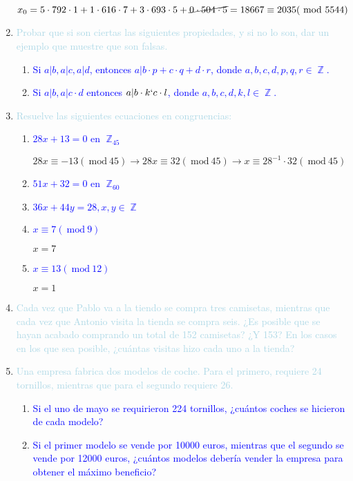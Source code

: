 \documentclass[12pt]{article}
\newcommand{\lb}[1]{\textcolor{lightblue}{#1}}
\newcommand{\db}[1]{\textcolor{blue}{#1}}
\DeclareMathOperator{\Z}{\mathbb{Z}}
\renewcommand{\mod}{~\mathrm{mod}~}
\begin{document}
\begin{enumerate}[label=\color{red}\textbf{\arabic*)}, leftmargin=*]
    $x_0=5\cdot792\cdot1+1\cdot616\cdot7+3\cdot693\cdot5+\cancel{0\cdot504\cdot5}=18667\equiv2035(\mod5544)$
   	\item \lb{Probar que si son ciertas las siguientes propiedades, y si no lo son, dar un ejemplo que muestre que son falsas.}
	\begin{enumerate}[label=\color{red}\alph*)]
		\item \db{Si $a|b,a|c,a|d$, entonces $a|b\cdot p+c\cdot q+d\cdot r$, donde $a,b,c,d,p,q,r\in\Z$.}
		\item \db{Si $a|b,a|c\cdot d$ entonces $a|b\cdot k`c\cdot l$, donde $a,b,c,d,k,l\in\Z$.}
	\end{enumerate}
	\item \lb{Resuelve las siguientes ecuaciones en congruencias:}
	\begin{enumerate}[label=\color{red}\alph*)]
		\item \db{$28x+13=0$ en $\Z_{45}$}
		
		$28x\equiv-13(\mod45)\longrightarrow28x\equiv32(\mod45)\longrightarrow x\equiv28^{-1}\cdot32(\mod45)$
		\item \db{$51x+32=0$ en $\Z_{60}$}
		\item \db{$36x+44y=28, x,y\in \Z$}
		\item \db{$x\equiv7(\mod9)$}
		
		$x=7$
		\item \db{$x\equiv13(\mod12)$}
		
		$x=1$
	\end{enumerate}
	\item \lb{Cada vez que Pablo va a la tiendo se compra tres camisetas, mientras que cada vez que Antonio visita la tienda se compra seis. ¿Es posible que se hayan acabado comprando un total de 152 camisetas? ¿Y 153? En los casos en los que sea posible, ¿cuántas visitas hizo cada uno a la tienda?}
	\item \lb{Una empresa fabrica dos modelos de coche. Para el primero, requiere 24 tornillos, mientras que para el segundo requiere 26.}
	\begin{enumerate}[label=\color{red}\alph*)]
		\item \db{Si el uno de mayo se requirieron 224 tornillos, ¿cuántos coches se hicieron de cada modelo?}
		\item \db{Si el primer modelo se vende por 10000 euros, mientras que el segundo se vende por 12000 euros, ¿cuántos modelos debería vender la empresa para obtener el máximo beneficio?}
	\end{enumerate}
\end{enumerate}
\newpage
\end{document}
